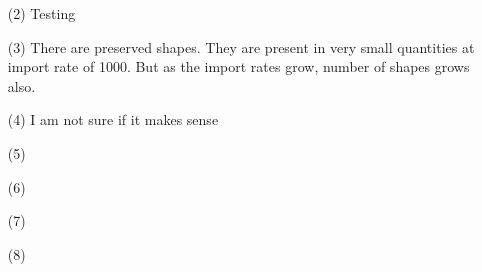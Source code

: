 \documentclass[journal=jacsat,manuscript=article,layout=twocolumn]{achemso}
\begin{document}
\begin{enumerate}
 \item [(2)] Testing
 \item [(3)] There are preserved shapes. They are present in very small quantities at import rate 
of 1000. But as the import rates grow, number of shapes grows also.
 \item [(4)] I am not sure if it makes sense
 \item [(5)]
 \item [(6)]
 \item [(7)]
 \item [(8)]
\end{enumerate}
 
\end{document}
